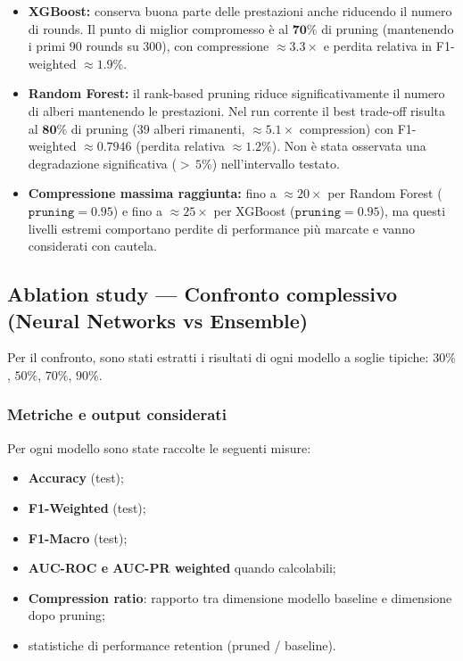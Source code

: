 \documentclass[a4paper,12pt]{report}
\begin{document}
	\begin{itemize}
		\item \textbf{XGBoost:} conserva buona parte delle prestazioni anche riducendo il numero di rounds. Il punto di miglior compromesso è al \(\mathbf{70\%}\) di pruning (mantenendo i primi 90 rounds su 300), con compressione \(\approx 3.3\times\) e perdita relativa in F1-weighted \(\approx 1.9\%\).
		\item \textbf{Random Forest:} il rank-based pruning riduce significativamente il numero di alberi mantenendo le prestazioni. Nel run corrente il best trade-off risulta al \(\mathbf{80\%}\) di pruning (39 alberi rimanenti, \(\approx 5.1\times\) compression) con F1-weighted \(\approx 0.7946\) (perdita relativa \(\approx 1.2\%\)). Non è stata osservata una degradazione significativa (\(>\,5\%\)) nell'intervallo testato.
		\item \textbf{Compressione massima raggiunta:} fino a \(\approx 20\times\) per Random Forest (\(\texttt{pruning}=0.95\)) e fino a \(\approx 25\times\) per XGBoost (\(\texttt{pruning}=0.95\)), ma questi livelli estremi comportano perdite di performance più marcate e vanno considerati con cautela.
	\end{itemize}
	
	\subsection{Ablation study — Confronto complessivo (Neural Networks vs Ensemble)}
	Per il confronto, sono stati estratti i risultati di ogni modello a soglie tipiche: \(30\%\), \(50\%\), \(70\%\), \(90\%\).
	
	\subsubsection{Metriche e output considerati}
	Per ogni modello sono state raccolte le seguenti misure:
	\begin{itemize}
		\item \textbf{Accuracy} (test);
		\item \textbf{F1-Weighted} (test);
		\item \textbf{F1-Macro} (test);
		\item \textbf{AUC-ROC e AUC-PR weighted} quando calcolabili;
		\item \textbf{Compression ratio}: rapporto tra dimensione modello baseline e dimensione dopo pruning;
		\item statistiche di performance retention (pruned / baseline).
	\end{itemize}
	
\end{document}
